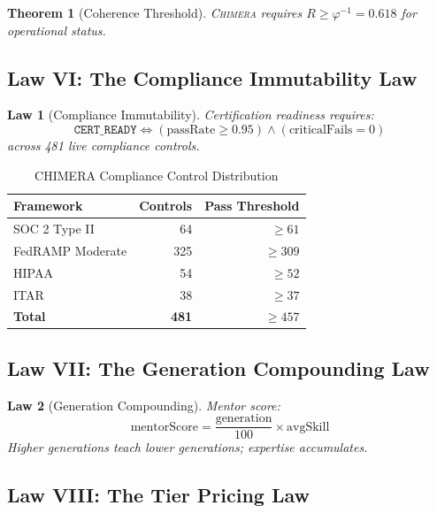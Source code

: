 \documentclass[12pt]{article}
\newtheorem{theorem}{Theorem}
\newtheorem{law}{Law}
\newcommand{\PHIINV}{\varphi^{-1}}
\newcommand{\CHIMERA}{\textsc{Chimera}}
\begin{document}
\begin{theorem}[Coherence Threshold]
\CHIMERA{} requires $R \geq \PHIINV = 0.618$ for operational status.
\end{theorem}

\subsection{Law VI: The Compliance Immutability Law}

\begin{law}[Compliance Immutability]
Certification readiness requires:
\begin{equation}
  \texttt{CERT\_READY} \iff (\text{passRate} \geq 0.95) \land (\text{criticalFails} = 0)
\end{equation}
across 481 live compliance controls.
\end{law}

\begin{table}[htbp]
\centering
\caption{CHIMERA Compliance Control Distribution}
\begin{tabular}{lrr}
\toprule
\textbf{Framework} & \textbf{Controls} & \textbf{Pass Threshold} \\
\midrule
SOC 2 Type II & 64 & $\geq 61$ \\
FedRAMP Moderate & 325 & $\geq 309$ \\
HIPAA & 54 & $\geq 52$ \\
ITAR & 38 & $\geq 37$ \\
\midrule
\textbf{Total} & \textbf{481} & $\geq 457$ \\
\bottomrule
\end{tabular}
\end{table}

\subsection{Law VII: The Generation Compounding Law}

\begin{law}[Generation Compounding]
Mentor score:
\begin{equation}
  \text{mentorScore} = \frac{\text{generation}}{100} \times \text{avgSkill}
\end{equation}
Higher generations teach lower generations; expertise accumulates.
\end{law}

\subsection{Law VIII: The Tier Pricing Law}
\end{document}
